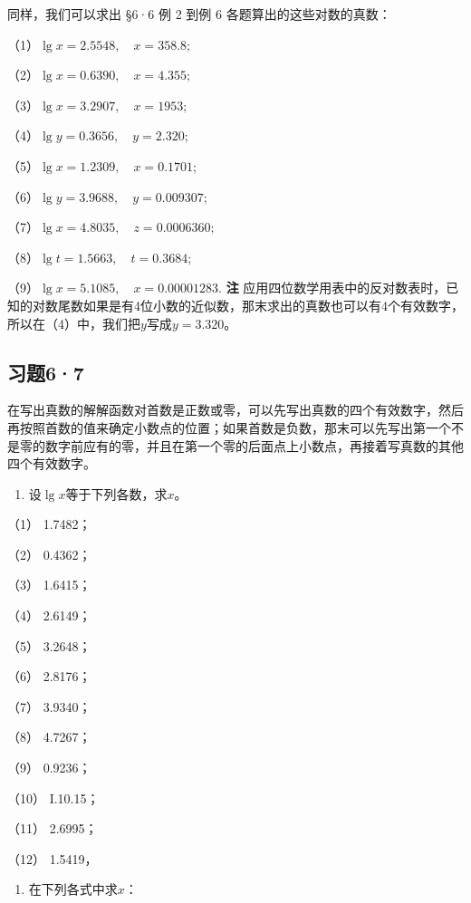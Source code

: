 同样，我们可以求出 §6·6 例 2 到例 6 各题算出的这些对数的真数：

（1）\(\lg x = 2.5548, \quad x = 358.8;\)

（2）\(\lg x = 0.6390, \quad x = 4.355;\)

（3）\(\lg x = 3.2907, \quad x = 1953;\)

（4）\(\lg y = 0.3656, \quad y = 2.320;\)

（5）\(\lg x = 1.2309, \quad x = 0.1701;\)

（6）\(\lg y = 3.9688, \quad y = 0.009307;\)

（7）\(\lg x = 4.8035, \quad z = 0.0006360;\)

（8）\(\lg t = 1.5663, \quad t = 0.3684;\)

（9）\(\lg x = 5.1085, \quad x = 0.00001283.\) \textbf{注}
应用四位数学用表中的反对数表时，已知的对数尾数如果是有4位小数的近似数，那末求出的真数也可以有4个有效数字，所以在（4）中，我们把\(y\)写成\(y = 3.320\)。

\subsection{习题6·7}

在写出真数的解解函数对首数是正数或零，可以先写出真数的四个有效数字，然后再按照首数的值来确定小数点的位置；如果首数是负数，那末可以先写出第一个不是零的数字前应有的零，并且在第一个零的后面点上小数点，再接着写真数的其他四个有效数字。

\begin{enumerate}
\item
  设\(\lg x\)等于下列各数，求\(x\)。
\end{enumerate}

（1） 1.7482；

（2） 0.4362；

（3） 1.6415；

（4） 2.6149；

（5） 3.2648；

（6） 2.8176；

（7） 3.9340；

（8） 4.7267；

（9） 0.9236；

（10） I.10.15；

（11） 2.6995；

（12） 1.5419，

\begin{enumerate}[start=2]
\item
  在下列各式中求\(x\)：
\end{enumerate}

